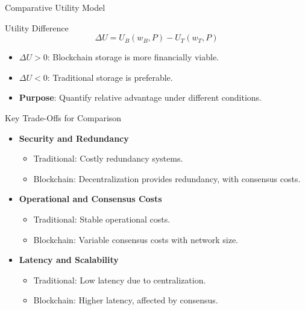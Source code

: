 \documentclass[aspectratio=169]{beamer}
\begin{document}
    \begin{frame}{Comparative Utility Model}
        \begin{block}{Utility Difference}
        \[
        \Delta U = U_B(w_B, P) - U_T(w_T, P)
        \]
        \end{block}
        \begin{itemize}
            \item \( \Delta U > 0 \): Blockchain storage is more financially viable.
            \item \( \Delta U < 0 \): Traditional storage is preferable.
        \end{itemize}
        \begin{itemize}
            \item \textbf{Purpose}: Quantify relative advantage under different conditions.
        \end{itemize}
    \end{frame}

    \begin{frame}{Key Trade-Offs for Comparison}
        \begin{itemize}
            \item \textbf{Security and Redundancy}
            \begin{itemize}
                \item Traditional: Costly redundancy systems.
                \item Blockchain: Decentralization provides redundancy, with consensus costs.
            \end{itemize}
            \item \textbf{Operational and Consensus Costs}
            \begin{itemize}
                \item Traditional: Stable operational costs.
                \item Blockchain: Variable consensus costs with network size.
            \end{itemize}
            \item \textbf{Latency and Scalability}
            \begin{itemize}
                \item Traditional: Low latency due to centralization.
                \item Blockchain: Higher latency, affected by consensus.
            \end{itemize}
        \end{itemize}
    \end{frame}
    
\end{document}
